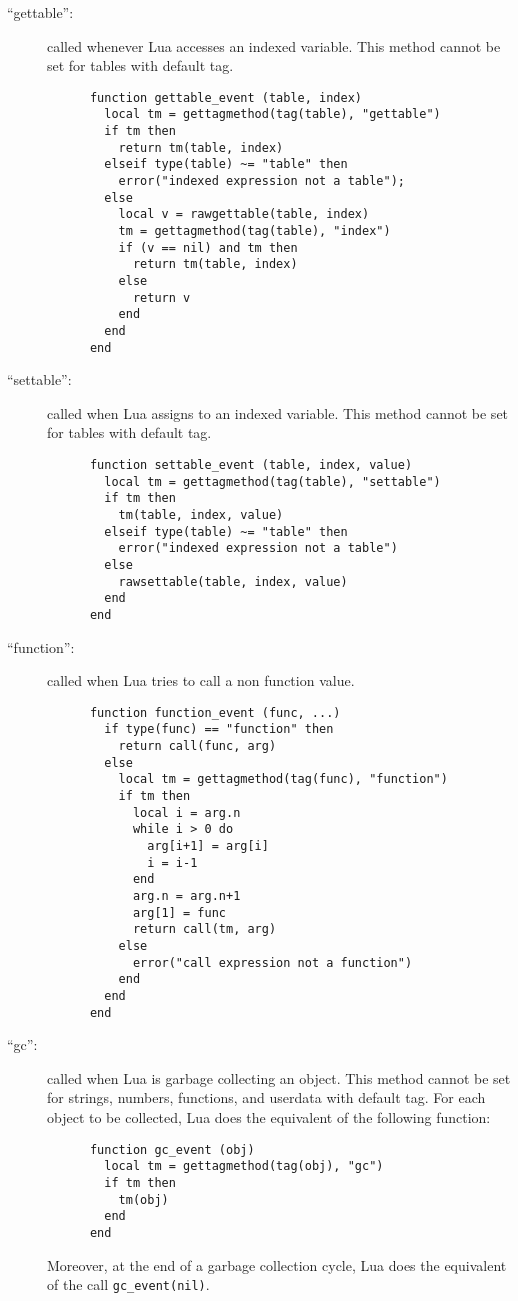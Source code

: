 \begin{description}
\item[``gettable'':]
called whenever Lua accesses an indexed variable.
This method cannot be set for tables with default tag.
\begin{verbatim}
      function gettable_event (table, index)
        local tm = gettagmethod(tag(table), "gettable")
        if tm then
          return tm(table, index)
        elseif type(table) ~= "table" then
          error("indexed expression not a table");
        else
          local v = rawgettable(table, index)
          tm = gettagmethod(tag(table), "index")
          if (v == nil) and tm then
            return tm(table, index)
          else
            return v
          end
        end
      end
\end{verbatim}

\item[``settable'':]
called when Lua assigns to an indexed variable.
This method cannot be set for tables with default tag.
\begin{verbatim}
      function settable_event (table, index, value)
        local tm = gettagmethod(tag(table), "settable")
        if tm then
          tm(table, index, value)
        elseif type(table) ~= "table" then
          error("indexed expression not a table")
        else
          rawsettable(table, index, value)
        end
      end
\end{verbatim}

\item[``function'':]
called when Lua tries to call a non function value.
\begin{verbatim}
      function function_event (func, ...)
        if type(func) == "function" then
          return call(func, arg)
        else
          local tm = gettagmethod(tag(func), "function")
          if tm then
            local i = arg.n
            while i > 0 do
              arg[i+1] = arg[i]
              i = i-1
            end
            arg.n = arg.n+1
            arg[1] = func
            return call(tm, arg)
          else
            error("call expression not a function")
          end
        end
      end
\end{verbatim}

\item[``gc'':]
called when Lua is garbage collecting an object.
This method cannot be set for strings, numbers, functions,
and userdata with default tag.
For each object to be collected,
Lua does the equivalent of the following function:
\begin{verbatim}
      function gc_event (obj)
        local tm = gettagmethod(tag(obj), "gc")
        if tm then
          tm(obj)
        end
      end
\end{verbatim}
Moreover, at the end of a garbage collection cycle,
Lua does the equivalent of the call \verb|gc_event(nil)|.

\end{description}



